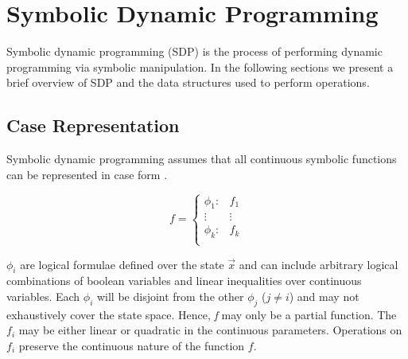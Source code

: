 \section{Symbolic Dynamic Programming}
\label{sec:sdp}

Symbolic dynamic programming (SDP) \cite{Boutilier_IJCAI_2001} is 
the process of performing dynamic programming via symbolic 
manipulation. In the following sections we present a brief overview
of SDP and the data structures used to perform operations.

\subsection{Case Representation}

Symbolic dynamic programming assumes that all continuous symbolic 
functions can be represented in case form \cite{Boutilier_IJCAI_2001}.

\begin{equation}
  f = 
    \begin{cases}
      \phi_1: & f_1 \\ 
      \vdots & \vdots\\ 
      \phi_k: & f_k \\ 
    \end{cases} \nonumber
\end{equation}

$\phi_i$ are logical formulae defined over the state $\vec{x}$ 
and can include arbitrary logical combinations of boolean variables and 
linear inequalities over continuous variables. Each $\phi_i$ will be 
disjoint from the other $\phi_j$ ($j \neq i$) and may not 
exhaustively cover the state space. Hence, \emph{f} may only be a 
partial function. The $f_i$ may be either linear or quadratic 
in the continuous parameters. Operations on $f_i$ preserve the 
continuous nature of the function $f$.
 
%
%
%


